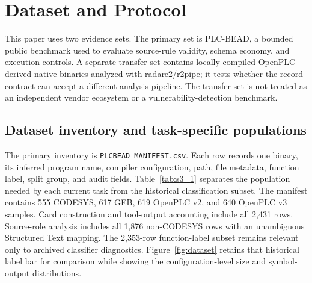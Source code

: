 \documentclass[manuscript,screen,review]{acmart}
\begin{document}
\section{Dataset and Protocol}

This paper uses two evidence sets. The primary set is PLC-BEAD, a bounded public benchmark used to evaluate source-rule validity, schema economy, and execution controls. A separate transfer set contains locally compiled OpenPLC-derived native binaries analyzed with radare2/r2pipe; it tests whether the record contract can accept a different analysis pipeline. The transfer set is not treated as an independent vendor ecosystem or a vulnerability-detection benchmark.

\subsection{Dataset inventory and task-specific populations}

The primary inventory is \texttt{PLCBEAD\_MANIFEST.csv}. Each row records one binary, its inferred program name, compiler configuration, path, file metadata, function label, split group, and audit fields. Table~\ref{tab:s3_1} separates the population needed by each current task from the historical classification subset. The manifest contains 555 CODESYS, 617 GEB, 619 OpenPLC v2, and 640 OpenPLC v3 samples. Card construction and tool-output accounting include all 2{,}431 rows. Source-role analysis includes all 1{,}876 non-CODESYS rows with an unambiguous Structured Text mapping. The 2{,}353-row function-label subset remains relevant only to archived classifier diagnostics. Figure~\ref{fig:dataset} retains that historical label bar for comparison while showing the configuration-level size and symbol-output distributions.
\end{document}
